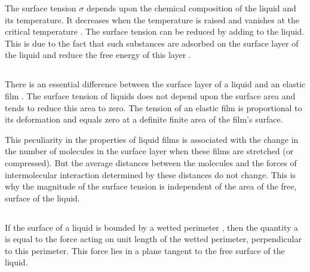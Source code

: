 The surface tension $\sigma$ depends upon the chemical composition of the liquid and its temperature. It decreases when the temperature is raised and vanishes at the critical temperature . The surface tension can be reduced by adding  to the liquid. This is due to the fact that such substances are adsorbed on the surface layer of the liquid and reduce the free energy of this layer .

\subsection{}\label{13.4.5} There is an essential difference between the surface layer of a liquid and an elastic film . The surface tension of liquids does not depend upon the surface area and tends to reduce this area to zero. The tension of an elastic film is proportional to its deformation and equals zero at a definite finite area of the film's surface.

This peculiarity in the properties of liquid films is associated with the change in the number of molecules in the surface layer when these films are stretched (or compressed). But the average distances between the molecules and the forces of intermolecular interaction determined by these distances do not change. This is why the magnitude of the surface tension is independent of the area of the free, surface of the liquid.

\subsection{}\label{13.4.6} If the surface of a liquid is bounded by a wetted perimeter , then the quantity a is equal to the force acting on unit length of the wetted perimeter, perpendicular to this perimeter. This force lies in a plane tangent to the free surface of the liquid.


